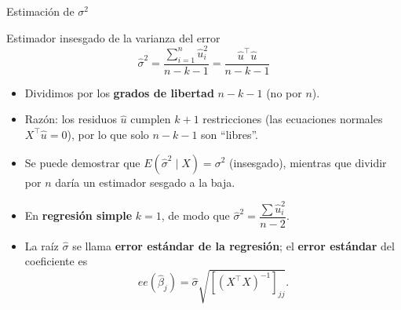 \documentclass{beamer}
\begin{document}
\begin{frame}{Estimación de $\sigma^2$}

\begin{block}{Estimador insesgado de la varianza del error}
\[
\hat{\sigma}^2 = \frac{\sum_{i=1}^n \hat{u}_i^2}{n-k-1} = \frac{\hat{u}^\top\hat{u}}{n-k-1}
\]
\end{block}

\begin{itemize}
    \item Dividimos por los \textbf{grados de libertad} $n-k-1$ (no por $n$).
    \pause
    \item Razón: los residuos $\hat{u}$ cumplen $k+1$ restricciones (las ecuaciones normales $X^\top\hat{u}=0$), por lo que solo $n-k-1$ son ``libres''.
    \pause
    \item Se puede demostrar que $E(\hat{\sigma}^2\mid X)=\sigma^2$ (insesgado), mientras que dividir por $n$ daría un estimador sesgado a la baja.
    \pause
    \item En \textbf{regresión simple} $k=1$, de modo que $\hat{\sigma}^2=\dfrac{\sum \hat{u}_i^2}{n-2}$.
    \item La raíz $\hat{\sigma}$ se llama \textbf{error estándar de la regresión}; el \textbf{error estándar} del coeficiente es
    \[
    ee(\hat{\beta}_j)=\hat{\sigma}\sqrt{[(X^{\top}X)^{-1}]_{jj}}.
    \]
\end{itemize}
\end{frame}
\end{document}
